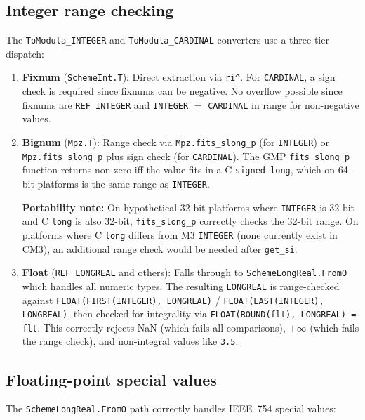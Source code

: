 \documentclass[11pt]{article}
\begin{document}
\subsection{Integer range checking}

The \texttt{ToModula\_INTEGER} and \texttt{ToModula\_CARDINAL}
converters use a three-tier dispatch:

\begin{enumerate}
\item \textbf{Fixnum} (\texttt{SchemeInt.T}): Direct extraction via
  \texttt{ri\^{}}.  For \texttt{CARDINAL}, a sign check is required
  since fixnums can be negative.  No overflow possible since fixnums
  are \texttt{REF INTEGER} and \texttt{INTEGER} $=$ \texttt{CARDINAL}
  in range for non-negative values.

\item \textbf{Bignum} (\texttt{Mpz.T}): Range check via
  \texttt{Mpz.fits\_slong\_p} (for \texttt{INTEGER}) or
  \texttt{Mpz.fits\_slong\_p} plus sign check (for \texttt{CARDINAL}).
  The GMP \texttt{fits\_slong\_p} function returns non-zero iff the
  value fits in a C \texttt{signed long}, which on 64-bit platforms is
  the same range as \texttt{INTEGER}.

  \textbf{Portability note:} On hypothetical 32-bit platforms where
  \texttt{INTEGER} is 32-bit and C \texttt{long} is also 32-bit,
  \texttt{fits\_slong\_p} correctly checks the 32-bit range.  On
  platforms where C \texttt{long} differs from M3 \texttt{INTEGER}
  (none currently exist in CM3), an additional range check would be
  needed after \texttt{get\_si}.

\item \textbf{Float} (\texttt{REF LONGREAL} and others): Falls through
  to \texttt{SchemeLongReal.FromO} which handles all numeric types.
  The resulting \texttt{LONGREAL} is range-checked against
  \texttt{FLOAT(FIRST(INTEGER), LONGREAL)} /
  \texttt{FLOAT(LAST(INTEGER), LONGREAL)}, then checked for integrality
  via \texttt{FLOAT(ROUND(flt), LONGREAL) = flt}.  This correctly
  rejects NaN (which fails all comparisons), $\pm\infty$ (which fails
  the range check), and non-integral values like \texttt{3.5}.
\end{enumerate}

\subsection{Floating-point special values}

The \texttt{SchemeLongReal.FromO} path correctly handles IEEE~754
special values:
\end{document}
